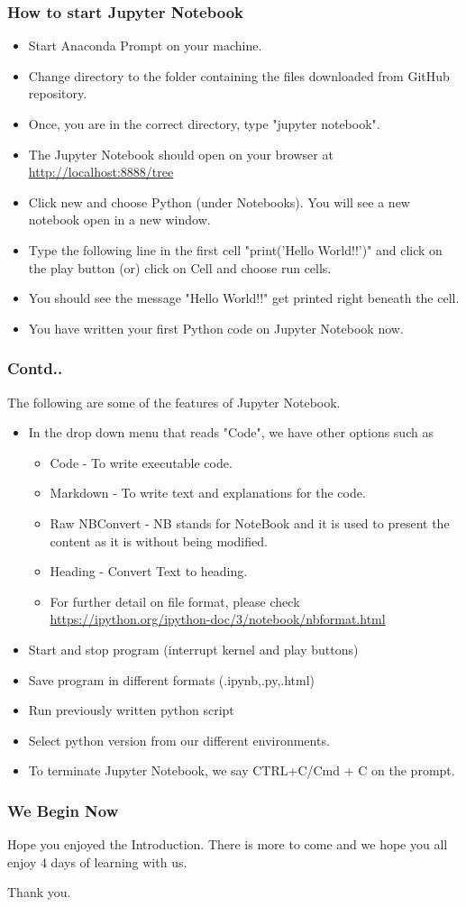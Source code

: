 \documentclass{beamer}
\begin{document}
\begin{frame}
\frametitle{How to start Jupyter Notebook}
\begin{itemize}
\item Start Anaconda Prompt on your machine.
\item Change directory to the folder containing the files downloaded from GitHub repository.
\item Once, you are in the correct directory, type  "jupyter notebook".
\item The Jupyter Notebook should open on your browser at \url{http://localhost:8888/tree}
\item Click new and choose Python (under Notebooks). You will see a new notebook open in a new window.
\item Type the following line in the first cell "print('Hello World!!')" and click on the play button (or) click on Cell and choose run cells.
\item You should see the message "Hello World!!" get printed right beneath the cell.
\item You have written your first Python code on Jupyter Notebook now.
\end{itemize}
\end{frame}

\begin{frame}
\frametitle{Contd..}
The following are some of the features of Jupyter Notebook.
\begin{itemize}
\item In the drop down menu that reads "Code", we have other options such as 
\begin{itemize}
\item Code - To write executable code.
\item Markdown - To write text and explanations for the code.
\item Raw NBConvert - NB stands for NoteBook and it is used to present the content as it is without being modified.
\item Heading -  Convert Text to heading.
\item For further detail on file format, please check \url{https://ipython.org/ipython-doc/3/notebook/nbformat.html} 
\end{itemize}
\item Start and stop program (interrupt kernel and play buttons)
\item Save program in different formats (.ipynb,.py,.html)
\item Run previously written python script
\item Select python version from our different environments.
\item To terminate Jupyter Notebook, we say CTRL+C/Cmd + C on the prompt.
\end{itemize}
\end{frame}
\begin{frame}
\frametitle{We Begin Now}
\centering
Hope you enjoyed the Introduction. There is more to come and we hope you all enjoy 4 days of learning with us.


Thank you. 
\end{frame}
\end{document}
